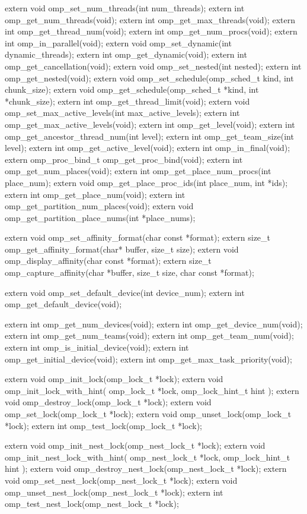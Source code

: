 {\begin{ompcFunction}
{extern void omp_set_num_threads(int num_threads);
extern int omp_get_num_threads(void);
extern int omp_get_max_threads(void);
extern int omp_get_thread_num(void);
extern int omp_get_num_procs(void);
extern int omp_in_parallel(void);
extern void omp_set_dynamic(int dynamic_threads);
extern int omp_get_dynamic(void);
extern int omp_get_cancellation(void);
extern void omp_set_nested(int nested);
extern int omp_get_nested(void);
extern void omp_set_schedule(omp_sched_t kind, int chunk_size);
extern void omp_get_schedule(omp_sched_t *kind, int *chunk_size);
extern int omp_get_thread_limit(void);
extern void omp_set_max_active_levels(int max_active_levels);
extern int omp_get_max_active_levels(void);
extern int omp_get_level(void);
extern int omp_get_ancestor_thread_num(int level);
extern int omp_get_team_size(int level);
extern int omp_get_active_level(void);
extern int omp_in_final(void);
extern omp_proc_bind_t omp_get_proc_bind(void);
extern int omp_get_num_places(void);
extern int omp_get_place_num_procs(int place_num);
extern void omp_get_place_proc_ids(int place_num, int *ids);
extern int omp_get_place_num(void);
extern int omp_get_partition_num_places(void);
extern void omp_get_partition_place_nums(int *place_nums);

extern void omp_set_affinity_format(char const *format);
extern size_t omp_get_affinity_format(char* buffer, size_t size);
extern void omp_display_affinity(char const *format);
extern size_t omp_capture_affinity(char *buffer, size_t size, char const *format);

extern void omp_set_default_device(int device_num);
extern int omp_get_default_device(void);

extern int omp_get_num_devices(void);
extern int omp_get_device_num(void);
extern int omp_get_num_teams(void);
extern int omp_get_team_num(void);
extern int omp_is_initial_device(void);
extern int omp_get_initial_device(void);
extern int omp_get_max_task_priority(void);

extern void omp_init_lock(omp_lock_t *lock);
extern void omp_init_lock_with_hint(
  omp_lock_t *lock,
  omp_lock_hint_t hint
);
extern void omp_destroy_lock(omp_lock_t *lock);
extern void omp_set_lock(omp_lock_t *lock);
extern void omp_unset_lock(omp_lock_t *lock);
extern int omp_test_lock(omp_lock_t *lock);

extern void omp_init_nest_lock(omp_nest_lock_t *lock);
extern void omp_init_nest_lock_with_hint(
  omp_nest_lock_t *lock,
  omp_lock_hint_t hint
);
extern void omp_destroy_nest_lock(omp_nest_lock_t *lock);
extern void omp_set_nest_lock(omp_nest_lock_t *lock);
extern void omp_unset_nest_lock(omp_nest_lock_t *lock);
extern int omp_test_nest_lock(omp_nest_lock_t *lock);

}
\end{ompcFunction}}
